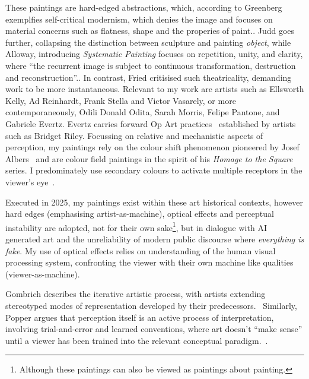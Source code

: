\documentclass[12pt]{article}
\begin{document}
These paintings are hard-edged abstractions, which, according to
Greenberg exemplfies self-critical modernism, which denies the image
and focuses on material concerns such as flatness, shape and the
properies of paint.\cite[p. 85-93]{Greenberg1961}. Judd goes further,
collapsing the distinction between sculpture and painting
\emph{object}\cite{Judd1965}, while Alloway, introducing
\emph{Systematic Painting} focuses on repetition, unity, and clarity,
where ``the recurrent image is subject to continuous transformation,
destruction and reconstruction''.\cite[pp. 18-19]{Alloway1975}. In
contrast, Fried critisised such theatricality, demanding work to be
more instantaneous.\cite[p. 12-23]{Fried1968} Relevant to my work are
artists such as Ellsworth Kelly, Ad Reinhardt, Frank Stella and Victor
Vasarely, or more contemporaneously, Odili Donald Odita, Sarah Morris,
Felipe Pantone, and Gabriele Evertz. Evertz carries forward Op Art
practices~\cite{Follin2004EmbodiedVisions,Seitz1965ResponsiveEye}
established by artists such as Bridget
Riley.\cite{Riley2019EyesMind,Riley2019DialoguesOnArt} Focussing on
relative and mechanistic aspects of perception, my paintings rely on
the colour shift phenomenon pioneered by Josef Albers~\cite{albers}
and are colour field paintings in the spirit of his \emph{Homage to
  the Square} series. I predominately use secondary colours to
activate multiple receptors in the viewer's
eye~\cite{HurvichJameson1957,Land1977,SchnapfKraftBaylor1987}.

Executed in 2025, my paintings exist within these art historical
contexts, however hard edges (emphasising artist-as-machine), 
optical effects and perceptual instability are adopted, not for their
own sake\footnote{Although these paintings can also be viewed as
  paintings about painting.}, but in dialogue with AI generated art
and the unreliability of modern public discourse where \emph{everything is
fake}. My use of optical effects relies on understanding of the human
visual processing system, confronting the viewer with their own
machine like qualities (viewer-as-machine).

Gombrich describes the iterative artistic process, with artists
extending stereotyped modes of representation developed by their
predecessors.~\cite[Chapters II, V]{gombrich1960art} Similarly, Popper
argues that perception itself is an active process of interpretation,
involving trial-and-error and learned conventions, where art doesn't
``make sense'' until a viewer has been trained into the relevant
conceptual paradigm.~\cite[Chapter 2]{popper1972objective}.
\end{document}
